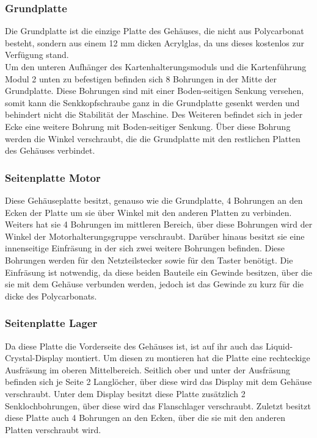 \subsubsection{Grundplatte}
Die Grundplatte ist die einzige Platte des Gehäuses, die nicht aus Polycarbonat besteht, sondern aus einem 12 mm dicken
Acrylglas, da uns dieses kostenlos zur Verfügung stand.\\
Um den unteren Aufhänger des Kartenhalterungsmoduls und die Kartenführung Modul 2 unten zu befestigen befinden sich 8
Bohrungen in der Mitte der Grundplatte. Diese Bohrungen sind mit einer Boden-seitigen Senkung versehen, somit kann die
Senkkopfschraube ganz in die Grundplatte gesenkt werden und behindert nicht die Stabilität der Maschine.
Des Weiteren befindet sich in jeder Ecke eine weitere Bohrung mit Boden-seitiger Senkung. Über diese Bohrung werden die
Winkel verschraubt, die die Grundplatte mit den restlichen Platten des Gehäuses verbindet.

\subsubsection{Seitenplatte Motor}
Diese Gehäuseplatte besitzt, genauso wie die Grundplatte, 4 Bohrungen an den Ecken der Platte um sie über Winkel
mit den anderen Platten zu verbinden. Weiters hat sie 4 Bohrungen im mittleren Bereich, über diese Bohrungen wird
der Winkel der Motorhalterungsgruppe verschraubt. Darüber hinaus besitzt sie eine innenseitige Einfräsung in der sich
zwei weitere Bohrungen befinden. Diese Bohrungen werden für den Netzteilstecker sowie für den Taster benötigt.
Die Einfräsung ist notwendig, da diese beiden Bauteile ein Gewinde besitzen, über die sie mit dem Gehäuse verbunden werden,
jedoch ist das Gewinde zu kurz für die dicke des Polycarbonats.

\subsubsection{Seitenplatte Lager}
Da diese Platte die Vorderseite des Gehäuses ist, ist auf ihr auch das Liquid-Crystal-Display montiert. Um diesen zu montieren
hat die Platte eine rechteckige Ausfräsung im oberen Mittelbereich. Seitlich ober und unter der Ausfräsung befinden sich
je Seite 2 Langlöcher, über diese wird das Display mit dem Gehäuse verschraubt.
Unter dem Display besitzt diese Platte zusätzlich 2 Senklochbohrungen, über diese wird das Flanschlager verschraubt.
Zuletzt besitzt diese Platte auch 4 Bohrungen an den Ecken, über die sie mit den anderen Platten verschraubt wird.

